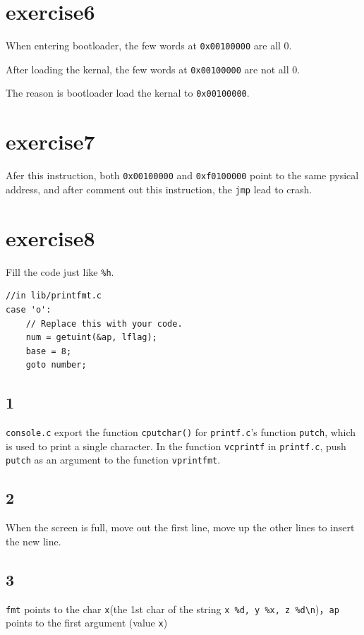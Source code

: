 \documentclass[UTF8,11pt]{ctexart}
\begin{document}
\section*{exercise6}

When entering bootloader, the few words at \verb|0x00100000| are all 0.

After loading the kernal, the few words at \verb|0x00100000| are not all 0.

The reason is bootloader load the kernal to \verb|0x00100000|.
\section*{exercise7}

Afer this instruction, both \verb|0x00100000| and \verb|0xf0100000| point to the same pysical address, and after comment out this instruction, the \verb|jmp| lead to crash.
\section*{exercise8}
Fill the code just like \verb|%h|.

\begin{lstlisting}
//in lib/printfmt.c
case 'o':
    // Replace this with your code.
    num = getuint(&ap, lflag);
    base = 8;
    goto number;
\end{lstlisting}
\subsection*{1}
\verb|console.c| export the function \verb|cputchar()| for \verb|printf.c|'s function \verb|putch|, which is used to print a single character. In the function \verb|vcprintf| in \verb|printf.c|, push \verb|putch| as an argument to the function \verb|vprintfmt|. 
\subsection*{2}
When the screen is full, move out the first line, move up the other lines to insert the new line.
\subsection*{3}
\verb|fmt| points to the char \verb|x|(the 1st char of the string \verb|x %d, y %x, z %d\n|)，\verb|ap| points to the first argument (value \verb|x|)
\end{document}
